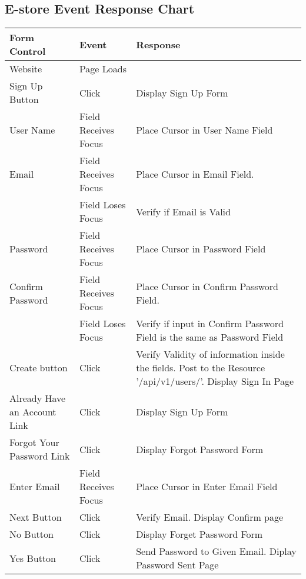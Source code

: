 \documentclass[12pt]{article}
\begin{document}
\begin{center}
	\section*{E-store Event Response Chart}	
	\begin{tabular}{ m{1.5in} | m{1.5in} | m{1.5in} }	
	\textbf{Form Control} & \textbf{Event} & \textbf{Response} \\
	\hline
	Website 				& Page Loads 			& \\
	\hline
	Sign Up Button 		& Click 					& Display Sign Up Form \\
	\hline
	User Name 			& Field Receives Focus 	& Place Cursor in User Name Field \\
	\hline
	Email 				& Field Receives Focus 	& Place Cursor in Email Field. \\ \cline{2-3}
	      				& Field Loses Focus 		& Verify if Email is Valid \\
	\hline
	Password 			& Field Receives Focus 	& Place Cursor in Password Field \\
	\hline
	Confirm Password 	& Field Receives Focus 	& Place Cursor in Confirm Password Field. \\ \cline{2-3}
						& Field Loses Focus 		& Verify if input in Confirm Password Field is the same as Password Field \\
	\hline
	Create button 		& Click 					& Verify Validity of information inside the fields. Post to the Resource '/api/v1/users/'. Display Sign In Page  	\\
	\hline
	Already Have an Account Link & Click 			& Display Sign Up Form \\
	\hline
	Forgot Your Password Link & Click 			& Display Forgot Password Form \\
	\hline 	
	Enter Email 			& Field Receives Focus 	& Place Cursor in Enter Email Field \\
	\hline
	Next Button 			& Click 					& Verify Email. Display Confirm page \\
	\hline
	No Button 			& Click				 	& Display Forget Password Form \\
	\hline
	Yes Button 			& Click 					& Send Password to Given Email. Diplay Password Sent Page \\
	\end{tabular}
	\newpage
	

\end{center}
\end{document}
